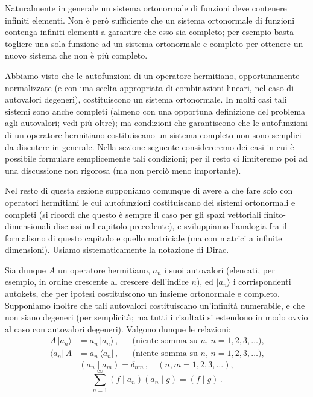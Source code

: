 \documentclass[11pt, a4paper]{book}
\numberwithin{equation}{section}
\begin{document}
Naturalmente in generale un sistema ortonormale di funzioni deve contenere infiniti elementi. Non è però sufficiente che un sistema ortonormale di funzioni contenga infiniti elementi a garantire che esso sia completo; per esempio basta togliere una sola funzione ad un sistema ortonormale e completo per ottenere un nuovo sistema che non è più completo.

Abbiamo visto che le autofunzioni di un operatore hermitiano, opportunamente normalizzate (e con una scelta appropriata di combinazioni lineari, nel caso di autovalori degeneri), costituiscono un sistema ortonormale. In molti casi tali sistemi sono anche completi (almeno con una opportuna definizione del problema agli autovalori; vedi più oltre); ma condizioni che garantiscono che le autofunzioni di un operatore hermitiano costituiscano un sistema completo non sono semplici da discutere in generale. Nella sezione seguente considereremo dei casi in cui è possibile formulare semplicemente tali condizioni; per il resto ci limiteremo poi ad una discussione non rigorosa (ma non perciò meno importante).

Nel resto di questa sezione supponiamo comunque di avere a che fare solo con operatori hermitiani le cui autofunzioni costituiscano dei sistemi ortonormali e completi (si ricordi che questo è sempre il caso per gli spazi vettoriali finito-dimensionali discussi nel capitolo precedente), e sviluppiamo l'analogia fra il formalismo di questo capitolo e quello matriciale (ma con matrici a infinite dimensioni). Usiamo sistematicamente la notazione di Dirac.

Sia dunque $A$ un operatore hermitiano, $a_n$ i suoi autovalori (elencati, per esempio, in ordine crescente al crescere dell'indice $n$), ed $|a_n\rangle$ i corrispondenti autokets, che per ipotesi costituiscono un insieme ortonormale e completo. Supponiamo inoltre che tali autovalori costituiscano un'infinità numerabile, e che non siano degeneri (per semplicità; ma tutti i risultati si estendono in modo ovvio al caso con autovalori degeneri). Valgono dunque le relazioni:
\begin{align}
A\,|a_n\rangle &= a_n\,|a_n\rangle\,, & &\text{(niente somma su $n$, $n=1,2,3,\ldots$),} \tag{9a}\\
\langle a_n|\,A &= a_n\,\langle a_n|\,, & &\text{(niente somma su $n$, $n=1,2,3,\ldots$),} \tag{9b}
\end{align}
\begin{equation}
(a_n\mid a_m)=\delta_{nm}\,,\quad(n,m=1,2,3,\ldots), \tag{10}
\end{equation}
\begin{equation}
\sum_{n=1}^{\infty}(f\mid a_n)(a_n\mid g)=(f\mid g)\,. \tag{11}
\end{equation}
\end{document}
